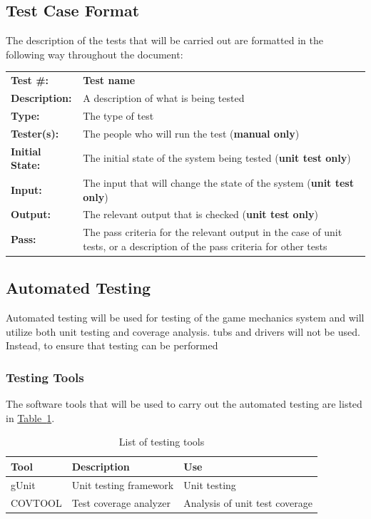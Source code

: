 \documentclass[12pt, titlepage]{article}
\begin{document}
\subsection{Test Case Format}
The description of the tests that will be carried out are formatted in the following way throughout the document:

\begin{mdframed}[linewidth=1pt]
\begin{tabularx}{\textwidth}{@{}p{3cm}X@{}}
{\bf Test \#:} & {\bf Test name}\\[\baselineskip]
{\bf Description:} & A description of what is being tested\\[0.5\baselineskip]
{\bf Type:} & The type of test\\[0.5\baselineskip]
{\bf Tester(s):} & The people who will run the test ({\bf manual only})\\[0.5\baselineskip]
{\bf Initial State:} & The initial state of the system being tested ({\bf unit test only})\\[0.5\baselineskip]
{\bf Input:} &  The input that will change the state of the system ({\bf unit test only})\\[0.5\baselineskip]
{\bf Output:} & The relevant output that is checked ({\bf unit test only})\\[0.5\baselineskip]
{\bf Pass:} & The pass criteria for the relevant output in the case of unit tests, or a description of the pass criteria for other tests
\end{tabularx}
\end{mdframed}

\subsection{Automated Testing}
Automated testing will be used for testing of the game mechanics system and will utilize both unit testing and coverage analysis.  tubs and drivers will not be used.  Instead, to ensure that testing can be performed

\subsubsection{Testing Tools}
The software tools that will be used to carry out the automated testing are listed in \hyperref[tab:tools]{Table~\ref*{tab:tools}}.

\begin{table}[ht]
\caption{List of testing tools} \label{tab:tools}
\begin{tabularx}{\textwidth}{p{2.3cm}p{4.5cm}X}
\toprule {\bf Tool} & {\bf Description} & {\bf Use}\\
\midrule
gUnit & Unit testing framework & Unit testing\\
COVTOOL & Test coverage analyzer & Analysis of unit test coverage\\
\bottomrule
\end{tabularx}
\end{table}
\end{document}
